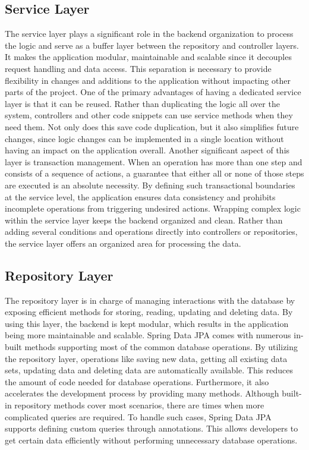     \subsection{Service Layer}
    The service layer plays a significant role in the backend organization to process the logic and serve as a buffer layer between the repository and controller layers. It makes the application modular, maintainable and scalable since it decouples request handling and data access. This separation is necessary to provide flexibility in changes and additions to the application without impacting other parts of the project. \newline
    One of the primary advantages of having a dedicated service layer is that it can be reused. Rather than duplicating the logic all over the system, controllers and other code snippets can use service methods when they need them. Not only does this save code duplication, but it also simplifies future changes, since logic changes can be implemented in a single location without having an impact on the application overall. \newline
    Another significant aspect of this layer is transaction management. When an operation has more than one step and consists of a sequence of actions, a guarantee that either all or none of those steps are executed is an absolute necessity. By defining such transactional boundaries at the service level, the application ensures data consistency and prohibits incomplete operations from triggering undesired actions. \newline
    Wrapping complex logic within the service layer keeps the backend organized and clean. Rather than adding several conditions and operations directly into controllers or repositories, the service layer offers an organized area for processing the data. 

    \subsection{Repository Layer}
    The repository layer is in charge of managing interactions with the database by exposing efficient methods for storing, reading, updating and deleting data. By using this layer, the backend is kept modular, which results in the application being more maintainable and scalable. \newline
    Spring Data JPA comes with numerous in-built methods supporting most of the common database operations. By utilizing the repository layer, operations like saving new data, getting all existing data sets, updating data and deleting data are automatically available. This reduces the amount of code needed for database operations. Furthermore, it also accelerates the development process by providing many methods. \newline
    Although built-in repository methods cover most scenarios, there are times when more complicated queries are required. To handle such cases, Spring Data JPA supports defining custom queries through annotations. This allows developers to get certain data efficiently without performing unnecessary database operations.

